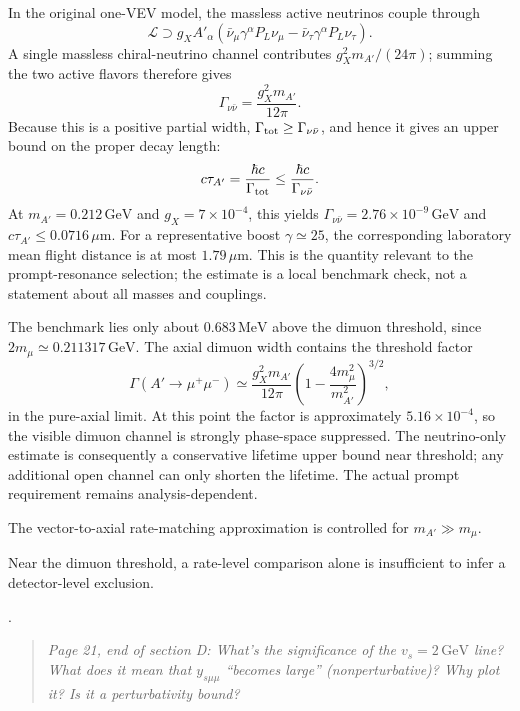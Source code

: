 \documentclass[12pt,a4paper]{article}
\begin{document}
In the original one-VEV model, the massless active neutrinos couple through
\[
\mathcal L\supset
g_X A'_\alpha\left(
\bar\nu_\mu\gamma^\alpha P_L\nu_\mu
-\bar\nu_\tau\gamma^\alpha P_L\nu_\tau
\right).
\]
A single massless chiral-neutrino channel contributes \(g_X^2m_{A'}/(24\pi)\); summing the two active flavors therefore gives
\[
\Gamma_{\nu\bar\nu}
=\frac{g_X^2m_{A'}}{12\pi}.
\]
Because this is a positive partial width, \(\Gamma_{\rm tot}\geq\Gamma_{\nu\bar\nu}\), and hence it gives an upper bound on the proper decay length:
\[
c\tau_{A'}=\frac{\hbar c}{\Gamma_{\rm tot}}
\leq\frac{\hbar c}{\Gamma_{\nu\bar\nu}}.
\]
At \(m_{A'}=0.212\,\mathrm{GeV}\) and \(g_X=7\times10^{-4}\), this yields \(\Gamma_{\nu\bar\nu}=2.76\times10^{-9}\,\mathrm{GeV}\) and \(c\tau_{A'}\leq0.0716\,\mu\mathrm{m}\). For a representative boost \(\gamma\simeq25\), the corresponding laboratory mean flight distance is at most \(1.79\,\mu\mathrm{m}\). This is the quantity relevant to the prompt-resonance selection; the estimate is a local benchmark check, not a statement about all masses and couplings.

The benchmark lies only about \(0.683\,\mathrm{MeV}\) above the dimuon threshold, since \(2m_\mu\simeq0.211317\,\mathrm{GeV}\). The axial dimuon width contains the threshold factor
\[
\Gamma(A'\to\mu^+\mu^-)
\simeq\frac{g_X^2m_{A'}}{12\pi}
\left(1-\frac{4m_\mu^2}{m_{A'}^2}\right)^{3/2},
\]
in the pure-axial limit. At this point the factor is approximately \(5.16\times10^{-4}\), so the visible dimuon channel is strongly phase-space suppressed. The neutrino-only estimate is consequently a conservative lifetime upper bound near threshold; any additional open channel can only shorten the lifetime. The actual prompt requirement remains analysis-dependent.

The vector-to-axial rate-matching approximation is controlled for \(m_{A'}\gg m_\mu\). 

Near the dimuon threshold, a rate-level comparison alone is insufficient to infer a detector-level exclusion.

\medskip
{}. \begin{quote}\itshape
Page 21, end of section D: What's the significance of the \(v_s=2\,\mathrm{GeV}\) line? What does it mean that \(y_{s\mu\mu}\) ``becomes large'' (nonperturbative)? Why plot it? Is it a perturbativity bound?
\end{quote}
\end{document}
